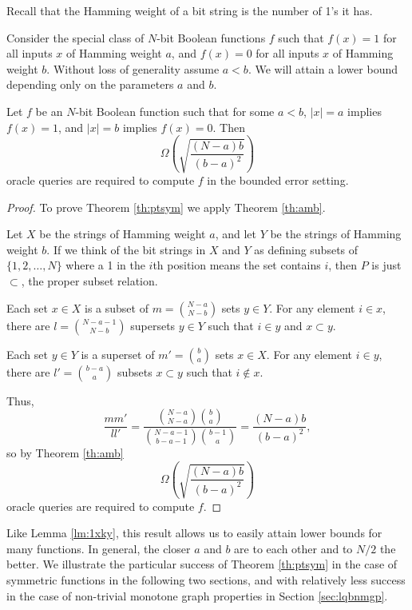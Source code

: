 Recall that the Hamming weight of a bit string is the number of 1's it
has.

Consider the special class of $N$-bit Boolean functions $f$ such that
$f(x) = 1$ for all inputs $x$ of Hamming weight $a$, and $f(x) = 0$
for all inputs $x$ of Hamming weight $b$.  Without loss of generality
assume $a < b$.  We will attain a lower bound depending only on the
parameters $a$ and $b$.

\begin{theorem}
\label{th:ptsym}
Let $f$ be an $N$-bit Boolean function such that for some $a < b$,
$|x| = a$ implies $f(x) = 1$, and $|x| = b$ implies $f(x) = 0$.  Then
\[
\Omega\left(\sqrt{\frac{(N-a)b}{(b-a)^{2}}}\right)
\]
oracle queries are required to compute $f$ in the bounded error
setting.
\end{theorem}

\begin{proof}
To prove Theorem \ref{th:ptsym} we apply Theorem \ref{th:amb}.

Let $X$ be the strings of Hamming weight $a$, and let $Y$ be the
strings of Hamming weight $b$.  If we think of the bit strings in $X$
and $Y$ as defining subsets of $\{1,2,\ldots,N\}$ where a 1 in the
$i$th position means the set contains $i$, then $P$ is just $\subset$,
the proper subset relation.

Each set $x \in X$ is a subset of $m = {N-a \choose N-b}$ sets $y \in
Y$.  For any element $i \in x$, there are $l = {N-a-1 \choose N-b}$
supersets $y \in Y$ such that $i \in y$ and $x \subset y$.

Each set $y \in Y$ is a superset of $m' = {b \choose a}$ sets $x \in
X$.  For any element $i \in y$, there are $l' = {b-a \choose a}$
subsets $x \subset y$ such that $i \not\in x$.

Thus,
\[\frac{mm'}{ll'} = \frac{{N-a \choose N-a}{b \choose a}}
	                 {{N-a-1 \choose b-a-1}{b-1 \choose a}} 
                  = 
		     \frac{\left(N-a\right)b}{\left(b-a\right)^{2}},
\]
so by Theorem \ref{th:amb}
\[
\Omega\left(\sqrt{\frac{(N-a)b}{(b-a)^{2}}}\right)
\]
oracle queries are required to compute $f$.
\end{proof}

Like Lemma \ref{lm:1xky}, this result allows us to easily attain lower
bounds for many functions.  In general, the closer $a$ and $b$ are to
each other and to $N/2$ the better.  We illustrate the particular
success of Theorem \ref{th:ptsym} in the case of symmetric functions
in the following two sections, and with relatively less success in the
case of non-trivial monotone graph properties in Section
\ref{sec:lqbnmgp}.

